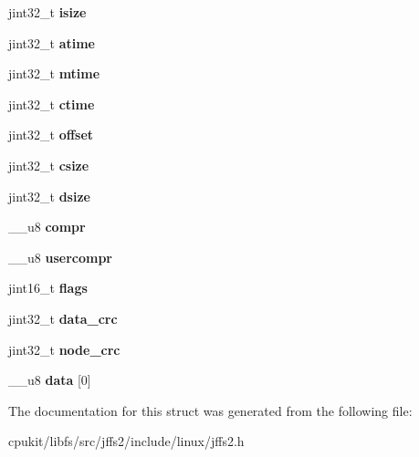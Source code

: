 \begin{DoxyCompactItemize}
\item 
\mbox{\label{structjffs2__raw__inode_a0582c7d56994da48bdd81c39649a4b93}} 
jint32\+\_\+t {\bfseries isize}
\item 
\mbox{\label{structjffs2__raw__inode_a068da56c0c0a2ae8fd842aee7420a8eb}} 
jint32\+\_\+t {\bfseries atime}
\item 
\mbox{\label{structjffs2__raw__inode_a8610941eb5f8c2899bd1e21f73ce3cd7}} 
jint32\+\_\+t {\bfseries mtime}
\item 
\mbox{\label{structjffs2__raw__inode_a36ffa21d8bbe5a8f27e107d1e5727d7d}} 
jint32\+\_\+t {\bfseries ctime}
\item 
\mbox{\label{structjffs2__raw__inode_a05677f0ca0630df02bb5b2b1922a1ebc}} 
jint32\+\_\+t {\bfseries offset}
\item 
\mbox{\label{structjffs2__raw__inode_ae94392d5f80344e597c787613657007b}} 
jint32\+\_\+t {\bfseries csize}
\item 
\mbox{\label{structjffs2__raw__inode_af0c4befb2d943394ce635d11697af5c3}} 
jint32\+\_\+t {\bfseries dsize}
\item 
\mbox{\label{structjffs2__raw__inode_a0bb75f83be1c1ebf428a8440ffe846a2}} 
\+\_\+\+\_\+u8 {\bfseries compr}
\item 
\mbox{\label{structjffs2__raw__inode_ac5f16af76acad8ccdff3223c0d16de6b}} 
\+\_\+\+\_\+u8 {\bfseries usercompr}
\item 
\mbox{\label{structjffs2__raw__inode_a349a377c7eb978c69203756298abedf7}} 
jint16\+\_\+t {\bfseries flags}
\item 
\mbox{\label{structjffs2__raw__inode_a5eab051eda6346f85c86785ec1a27053}} 
jint32\+\_\+t {\bfseries data\+\_\+crc}
\item 
\mbox{\label{structjffs2__raw__inode_aa099e8e375b9df8249f279bf234f70fa}} 
jint32\+\_\+t {\bfseries node\+\_\+crc}
\item 
\mbox{\label{structjffs2__raw__inode_a3b837362100c35d566cf5949741760ee}} 
\+\_\+\+\_\+u8 {\bfseries data} \mbox{[}0\mbox{]}
\end{DoxyCompactItemize}


The documentation for this struct was generated from the following file\+:\begin{DoxyCompactItemize}
\item 
cpukit/libfs/src/jffs2/include/linux/jffs2.\+h\end{DoxyCompactItemize}
